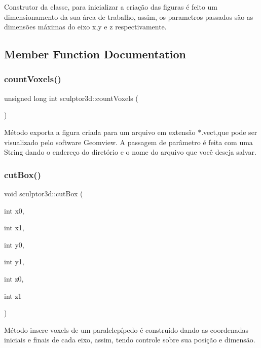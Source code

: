Construtor da classe, para inicializar a criação das figuras é feito um dimensionamento da sua área de trabalho, assim, os parametros passados são as dimensões máximas do eixo x,y e z respectivamente. 

\subsection{Member Function Documentation}
\mbox{\label{classsculptor3d_a39cb80b54a93e7e2cf8b2beddd7f1b74}} 
\subsubsection{\texorpdfstring{count\+Voxels()}{countVoxels()}}
{\footnotesize\ttfamily unsigned long int sculptor3d\+::count\+Voxels (\begin{DoxyParamCaption}{ }\end{DoxyParamCaption})}

Método exporta a figura criada para um arquivo em extensão $\ast$.vect,que pode ser visualizado pelo software Geomview. A passagem de parâmetro é feita com uma String dando o endereço do diretório e o nome do arquivo que você deseja salvar. \mbox{\label{classsculptor3d_ac92f60c7e3fd6ec3df820ddd118d7918}} 
\subsubsection{\texorpdfstring{cut\+Box()}{cutBox()}}
{\footnotesize\ttfamily void sculptor3d\+::cut\+Box (\begin{DoxyParamCaption}\item[{int}]{x0,  }\item[{int}]{x1,  }\item[{int}]{y0,  }\item[{int}]{y1,  }\item[{int}]{z0,  }\item[{int}]{z1 }\end{DoxyParamCaption})}

Método insere voxels de um paralelepípedo é construído dando as coordenadas iniciais e finais de cada eixo, assim, tendo controle sobre sua posição e dimensão. \mbox{\label{classsculptor3d_ab65ed666a86d01f428d6f735ad860cc6}} 
